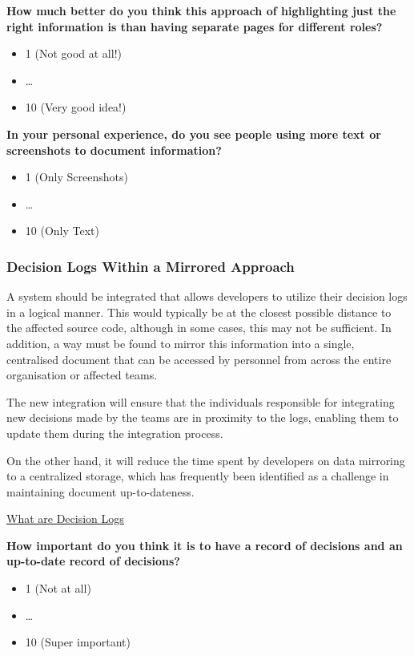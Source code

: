 \textbf{How much better do you think this approach of highlighting just the right information is than having separate pages for different roles?}
\begin{itemize}
    \item 1 (Not good at all!)
    \item \dots
    \item 10 (Very good idea!)
\end{itemize}

\textbf{In your personal experience, do you see people using more text or screenshots to document information?}
\begin{itemize}
    \item 1 (Only Screenshots)
    \item \dots
    \item 10 (Only Text)
\end{itemize}

\subsubsection*{Decision Logs Within a Mirrored Approach}
A system should be integrated that allows developers to utilize their decision logs in a logical manner. This would typically be at the closest possible distance to the affected source code, although in some cases, this may not be sufficient.
In addition, a way must be found to mirror this information into a single, centralised document that can be accessed by personnel from across the entire organisation or affected teams.

The new integration will ensure that the individuals responsible for integrating new decisions made by the teams are in proximity to the logs, enabling them to update them during the integration process.

On the other hand, it will reduce the time spent by developers on data mirroring to a centralized storage, which has frequently been identified as a challenge in maintaining document up-to-dateness.

\href{https://microsoft.github.io/code-with-engineering-playbook/design/design-reviews/decision-log/}{What are Decision Logs} 

\textbf{How important do you think it is to have a record of decisions and an up-to-date record of decisions?}
\begin{itemize}
    \item 1 (Not at all)
    \item \dots
    \item 10 (Super important)
\end{itemize}

